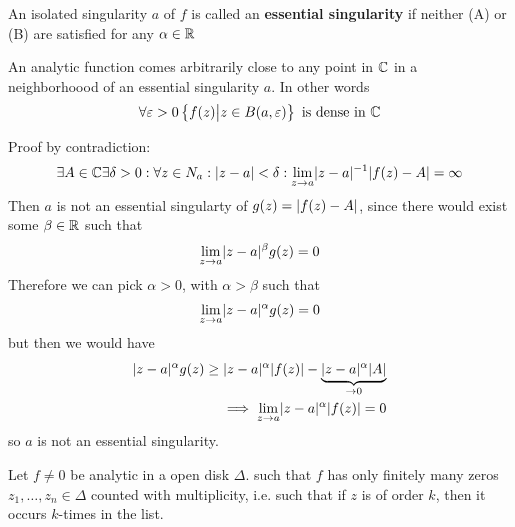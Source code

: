 \begin{definition}[]
	An isolated singularity $a$ of $f$ is called an \textbf{essential singularity} if neither (A) or (B) are satisfied for any $\alpha \in \mathbb{R}$
\end{definition}

\begin{theorem}[Weierstrass]
	An analytic function comes arbitrarily close to any point in $\mathbb{C}$ in a neighborhoood of an essential singularity $a$. In other words
	\begin{align*}
		\forall \varepsilon > 0 \left\{f(z) \big\vert z \in B(a, \varepsilon)\right\} \text{ is dense in } \mathbb{C}
	\end{align*}
\end{theorem}
Proof by contradiction:
\begin{align*}
	\exists A \in \C \exists \delta > 0: \forall z \in N_a: \abs{z-a} < \delta: \lim_{z \to a} \abs{z-a}^{-1} \abs{f(z) - A} = \infty
\end{align*}
Then $a$ is not an essential singularty of $g(z) = \vert f(z) - A\vert$, since there would exist some $\beta \in \mathbb{R}$ such that
\begin{align*}
	\lim_{z \to a}\abs{z-a}^{\beta}g(z) = 0
\end{align*}
Therefore we can pick $\alpha > 0$, with $\alpha > \beta$ such that
\begin{align*}
	\lim_{z \to a}\abs{z-a}^{\alpha}g(z) = 0
\end{align*}
but then we would have
\begin{align*}
	\abs{z-a}^{\alpha} g(z) \geq \abs{z-a}^{\alpha} \abs{f(z)} - \underbrace{\abs{z-a}^{\alpha}\abs{A}}_{\to 0}\\
	\implies \lim_{z \to a}\abs{z-a}^{\alpha}\abs{f(z)} = 0
\end{align*}
so $a$ is not an essential singularity.



Let $f\neq 0$ be analytic in a open disk $\Delta$. such that $f$ has only finitely many zeros $z_{1}, \ldots, z_{n} \in \Delta$ counted with multiplicity, i.e. such that if $z$ is of order $k$, then it occurs $k$-times in the list.

